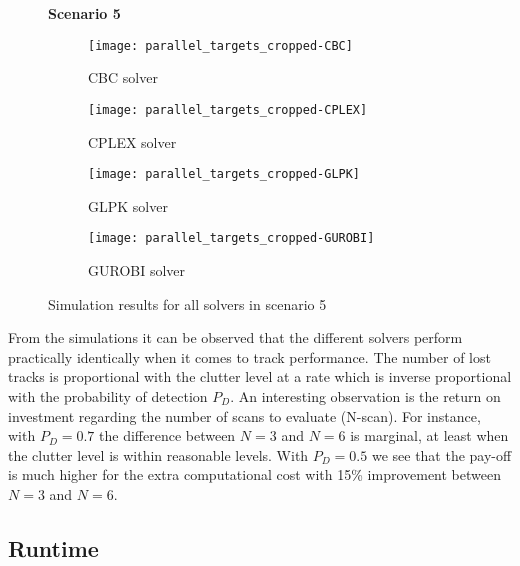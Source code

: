 \begin{figure}[H]
    \centering
    \textbf{Scenario 5}\par \medskip
    \begin{subfigure}{0.49\textwidth}
        \centering
        \texttt{[image: parallel\_targets\_cropped-CBC]}
        \caption{CBC solver}
    \end{subfigure}
    \begin{subfigure}{0.49\textwidth}
        \centering
        \texttt{[image: parallel\_targets\_cropped-CPLEX]}
        \caption{CPLEX solver}
    \end{subfigure}
    \begin{subfigure}{0.49\textwidth}
        \centering
        \texttt{[image: parallel\_targets\_cropped-GLPK]}
        \caption{GLPK solver}
    \end{subfigure}
    \begin{subfigure}{0.49\textwidth}
        \centering
        \texttt{[image: parallel\_targets\_cropped-GUROBI]}
        \caption{GUROBI solver}
    \end{subfigure}
    \caption{Simulation results for all solvers in scenario 5}
    \label{fig:parallel_targets_cropped}
\end{figure}
From the simulations it can be observed that the different solvers perform practically identically when it comes to track performance. The number of lost tracks is proportional with the clutter level at a rate which is inverse proportional with the probability of detection $P_D$. An interesting observation is the return on investment regarding the number of scans to evaluate (N-scan). For instance, with $P_D=0.7$ the difference between $N=3$ and $N=6$ is marginal, at least when the clutter level is within reasonable levels. With $P_D=0.5$ we see that the pay-off is much higher for the extra computational cost with 15\% improvement between $N=3$ and $N=6$.
\subsection{Runtime}

